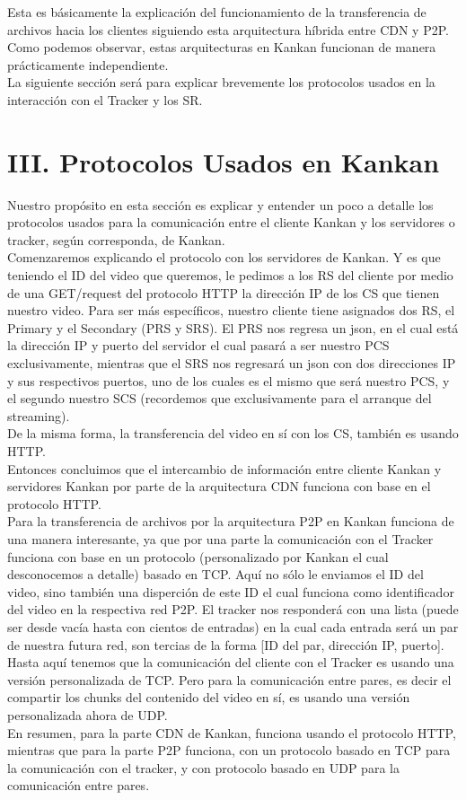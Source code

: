 \documentclass[12pt]{report}
\begin{document}
Esta es básicamente la explicación del funcionamiento de la transferencia de archivos hacia los clientes siguiendo esta arquitectura híbrida entre CDN y P2P. Como podemos observar, estas arquitecturas en Kankan funcionan de manera prácticamente independiente.\\
La siguiente sección será para explicar brevemente los protocolos usados en la interacción con el Tracker y los SR.\\

\section*{III. Protocolos Usados en Kankan}

Nuestro propósito en esta sección es explicar y entender un poco a detalle los protocolos usados para la comunicación entre el cliente Kankan y los servidores o tracker, según corresponda, de Kankan.\\
Comenzaremos explicando el protocolo con los servidores de Kankan. Y es que teniendo el ID del video que queremos, le pedimos a los RS del cliente por medio de una GET/request del protocolo HTTP la dirección IP de los CS que tienen nuestro video. Para ser más específicos, nuestro cliente tiene asignados dos RS, el Primary y el Secondary (PRS y SRS). El PRS nos regresa un json, en el cual está la dirección IP y puerto del servidor el cual pasará a ser nuestro PCS exclusivamente, mientras que el SRS nos regresará un json con dos direcciones IP y sus respectivos puertos, uno de los cuales es el mismo que será nuestro PCS, y el segundo nuestro SCS (recordemos que exclusivamente para el arranque del streaming).\\
De la misma forma, la transferencia del video en sí con los CS, también es usando HTTP.\\
Entonces concluimos que el intercambio de información entre cliente Kankan y servidores Kankan por parte de la arquitectura CDN funciona con base en el protocolo HTTP.\\
Para la transferencia de archivos por la arquitectura P2P en Kankan funciona de una manera interesante, ya que por una parte la comunicación con el Tracker funciona con base en un protocolo (personalizado por Kankan el cual desconocemos a detalle) basado en TCP. Aquí no sólo le enviamos el ID del video, sino también una disperción de este ID el cual funciona como identificador del video en la respectiva red P2P. El tracker nos responderá con una lista (puede ser desde vacía hasta con cientos de entradas) en la cual cada entrada será un par de nuestra futura red, son tercias de la forma [ID del par, dirección IP, puerto].\\
Hasta aquí tenemos que la comunicación del cliente con el Tracker es usando una versión personalizada de TCP. Pero para la comunicación entre pares, es decir el compartir los chunks del contenido del video en sí, es usando una versión personalizada ahora de UDP.\\
En resumen, para la parte CDN de Kankan, funciona usando el protocolo HTTP, mientras que para la parte P2P funciona, con un protocolo basado en TCP para la comunicación con el tracker, y con protocolo basado en UDP para la comunicación entre pares.\\
\end{document}
